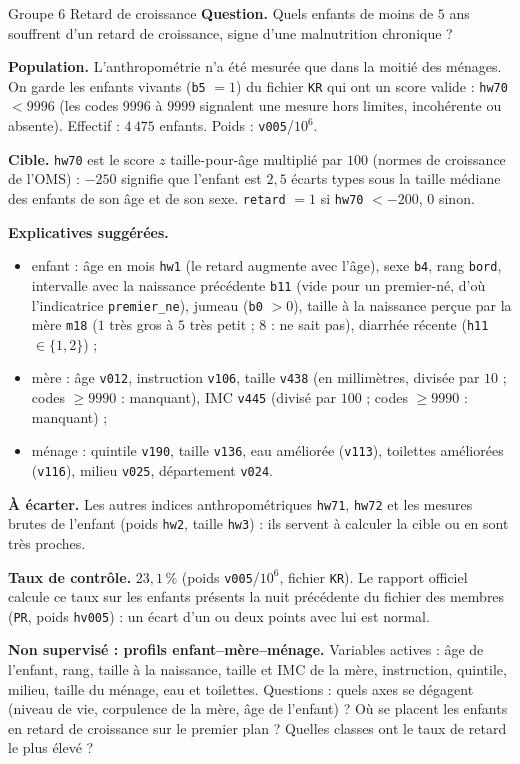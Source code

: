 \documentclass[11pt]{article}
\begin{document}
\begin{fiche}{Groupe 6 \textendash{} Retard de croissance}
\textbf{Question.} Quels enfants de moins de $5$ ans souffrent d'un retard de croissance, signe d'une malnutrition chronique ?

\textbf{Population.} L'anthropométrie n'a été mesurée que dans la moitié des ménages. On garde les enfants vivants (\texttt{b5} $=1$) du fichier \texttt{KR} qui ont un score valide : \texttt{hw70} $<9996$ (les codes $9996$ à $9999$ signalent une mesure hors limites, incohérente ou absente). Effectif : $4\,475$ enfants. Poids : \texttt{v005}/$10^6$.

\textbf{Cible.} \texttt{hw70} est le score $z$ taille-pour-âge multiplié par $100$ (normes de croissance de l'OMS) : $-250$ signifie que l'enfant est $2{,}5$ écarts types sous la taille médiane des enfants de son âge et de son sexe. \texttt{retard} $=1$ si \texttt{hw70} $<-200$, $0$ sinon.

\textbf{Explicatives suggérées.}
\begin{itemize}
  \item enfant : âge en mois \texttt{hw1} (le retard augmente avec l'âge), sexe \texttt{b4}, rang \texttt{bord}, intervalle avec la naissance précédente \texttt{b11} (vide pour un premier-né, d'où l'indicatrice \texttt{premier\_ne}), jumeau (\texttt{b0} $>0$), taille à la naissance perçue par la mère \texttt{m18} ($1$ très gros à $5$ très petit ; $8$ : ne sait pas), diarrhée récente (\texttt{h11} $\in\{1,2\}$) ;
  \item mère : âge \texttt{v012}, instruction \texttt{v106}, taille \texttt{v438} (en millimètres, divisée par $10$ ; codes $\ge9990$ : manquant), IMC \texttt{v445} (divisé par $100$ ; codes $\ge9990$ : manquant) ;
  \item ménage : quintile \texttt{v190}, taille \texttt{v136}, eau améliorée (\texttt{v113}), toilettes améliorées (\texttt{v116}), milieu \texttt{v025}, département \texttt{v024}.
\end{itemize}

\textbf{À écarter.} Les autres indices anthropométriques \texttt{hw71}, \texttt{hw72} et les mesures brutes de l'enfant (poids \texttt{hw2}, taille \texttt{hw3}) : ils servent à calculer la cible ou en sont très proches.

\textbf{Taux de contrôle.} $23{,}1\,\%$ (poids \texttt{v005}/$10^6$, fichier \texttt{KR}). Le rapport officiel calcule ce taux sur les enfants présents la nuit précédente du fichier des membres (\texttt{PR}, poids \texttt{hv005}) : un écart d'un ou deux points avec lui est normal.

\textbf{Non supervisé : profils enfant--mère--ménage.} Variables actives : âge de l'enfant, rang, taille à la naissance, taille et IMC de la mère, instruction, quintile, milieu, taille du ménage, eau et toilettes. Questions : quels axes se dégagent (niveau de vie, corpulence de la mère, âge de l'enfant) ? Où se placent les enfants en retard de croissance sur le premier plan ? Quelles classes ont le taux de retard le plus élevé ?
\end{fiche}

\end{document}
